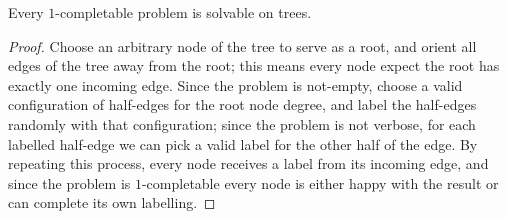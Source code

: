 \documentclass[12pt,a4paper]{article}
\begin{document}
\begin{lem}
    Every $1$-completable problem is solvable on trees.
\end{lem}
\begin{proof}
    Choose an arbitrary node of the tree to serve as a root, and orient all edges of the tree away from the root; this means every node expect the root has exactly one incoming edge. Since the problem is not-empty, choose a valid configuration of half-edges for the root node degree, and label the half-edges randomly with that configuration; since the problem is not verbose, for each labelled half-edge we can pick a valid label for the other half of the edge. By repeating this process, every node receives a label from its incoming edge, and since the problem is $1$-completable every node is either happy with the result or can complete its own labelling.
\end{proof}
\end{document}
